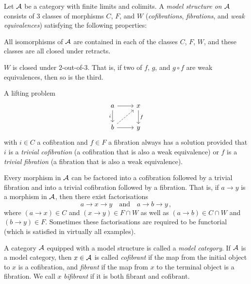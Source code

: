 \begin{defi}\label{def:ModelCategory}
	Let $\mathcal{A}$ be a category with finite limits and colimits. A \emph{model structure on $\mathcal{A}$} consists of 3 classes of morphisms $C$, $F$, and $W$ (\emph{cofibrations}, \emph{fibrations}, and \emph{weak equivalences}) satisfying the following properties:
	\begin{alphanumerate}
		\item All isomorphisms of $\mathcal{A}$ are contained in each of the classes $C$, $F$, $W$, and these classes are all closed under retracts.\label{enum:ModelCategoryCFW}
		\item $W$ is closed under $2$-out-of-$3$. That is, if two of $f$, $g$, and $g\circ f$ are weak equivalences, then so is the third.\label{enum:ModelCategory2OutOf3}
		\item A lifting problem\label{enum:ModelCategoryLifting}
		\begin{equation*}
			\begin{tikzcd}
				a\rar\dar["i"'] & x\dar["f"]\\
				b\urar[dashed]\rar & y
			\end{tikzcd}
		\end{equation*}
		with $i\in C$ a cofibration and $f\in F$ a fibration always has a solution provided that $i$ is a \emph{trivial cofibration} (a cofibration that is also a weak equivalence) or $f$ is a \emph{trivial fibration} (a fibration that is also a weak equivalence).
		\item Every morphism in $\mathcal{A}$ can be factored into a cofibration followed by a trivial fibration and into a trivial cofibration followed by a fibration. That is, if $a\rightarrow y$ is a morphism in $\mathcal{A}$, then there exist factorisations\label{enum:ModelCategoryFactorisations}
		\begin{equation*}
			a\longrightarrow x\longrightarrow y\quad\text{and}\quad a\longrightarrow b\longrightarrow y\,,
		\end{equation*}
		where $(a\rightarrow x)\in C$ and $(x\rightarrow y)\in F\cap W$ as well as $(a\rightarrow b)\in C\cap W$ and $(b\rightarrow y)\in F$. Sometimes these factorisations are required to be functorial (which is satisfied in virtually all examples).
	\end{alphanumerate}
	A category $\mathcal{A}$ equipped with a model structure is called a \emph{model category}. If $\mathcal{A}$ is a model category, then $x\in \mathcal{A}$ is called \emph{cofibrant} if the map from the initial object to $x$ is a cofibration, and \emph{fibrant} if the map from $x$ to the terminal object is a fibration. We call $x$ \emph{bifibrant} if it is both fibrant and cofibrant.
\end{defi}
